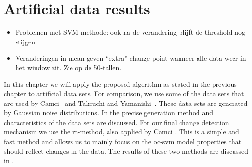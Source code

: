 
\chapter{Artificial data results}

\label{Chapter5} %

\begin{itemize}
  \item Problemen met SVM methode: ook na de verandering blijft de threshold nog stijgen;
  \item Veranderingen in mean geven ``extra'' change point wanneer alle data weer in het window zit. Zie  op de 50-tallen.
\end{itemize}

In this chapter we will apply the proposed algorithm as stated in the previous chapter to artificial data sets.
For comparison, we use some of the data sets that are used by Camci~\cite{camci2010change} and Takeuchi and Yamanishi~\cite{takeuchi2006unifying}.
These data sets are generated by Gaussian noise distributions.
In  the precise generation method and characteristics of the data sets are discussed.
For our final change detection mechanism we use the \gls{rt}-method, also applied by Camci \cite{camci2010change}.
This is a simple and fast method and allows us to mainly focus on the \gls{oc-svm} model properties that should reflect changes in the data.
The results of these two methods are discussed in .




